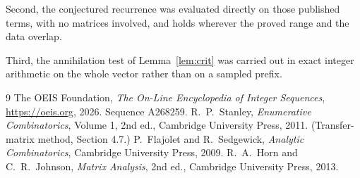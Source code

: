 \documentclass[11pt,a4paper]{article}
\theoremstyle{plain}
\theoremstyle{definition}
\begin{document}
Second, the conjectured recurrence was evaluated directly on those published terms, with no
matrices involved, and holds wherever the proved range and the data overlap.

Third, the annihilation test of Lemma~\ref{lem:crit} was carried out in exact integer
arithmetic on the whole vector rather than on a sampled prefix.

\begin{thebibliography}{9}
 The OEIS Foundation, \emph{The On-Line Encyclopedia of Integer
Sequences}, \url{https://oeis.org}, 2026. Sequence A268259.
 R.~P.~Stanley, \emph{Enumerative Combinatorics}, Volume 1, 2nd ed.,
Cambridge University Press, 2011. (Transfer-matrix method, Section 4.7.)
 P.~Flajolet and R.~Sedgewick, \emph{Analytic Combinatorics}, Cambridge
University Press, 2009.
 R.~A.~Horn and C.~R.~Johnson, \emph{Matrix Analysis}, 2nd ed., Cambridge
University Press, 2013.
\end{thebibliography}
\end{document}
